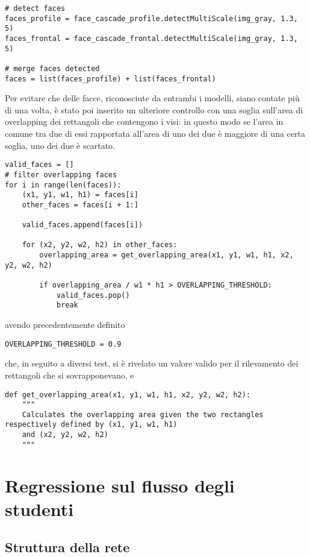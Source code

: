 \begin{verbatim}
# detect faces
faces_profile = face_cascade_profile.detectMultiScale(img_gray, 1.3, 5)
faces_frontal = face_cascade_frontal.detectMultiScale(img_gray, 1.3, 5)

# merge faces detected
faces = list(faces_profile) + list(faces_frontal)
\end{verbatim} 

Per evitare che delle facce, riconosciute da entrambi i modelli, siano contate più di una volta, è stato poi
inserito un ulteriore controllo con una soglia sull'area di overlapping dei rettangoli che contengono i visi:
in questo modo se l'area in comune tra due di essi rapportata all'area di uno dei due è maggiore di una certa 
soglia, uno dei due è scartato.

\begin{verbatim}
valid_faces = []
# filter overlapping faces
for i in range(len(faces)):
    (x1, y1, w1, h1) = faces[i]
    other_faces = faces[i + 1:]

    valid_faces.append(faces[i])

    for (x2, y2, w2, h2) in other_faces:
        overlapping_area = get_overlapping_area(x1, y1, w1, h1, x2, y2, w2, h2)

        if overlapping_area / w1 * h1 > OVERLAPPING_THRESHOLD:
            valid_faces.pop()
            break
\end{verbatim}
\noindent
avendo precedentemente definito

\begin{verbatim}
OVERLAPPING_THRESHOLD = 0.9
\end{verbatim} 

\noindent
che, in seguito a diversi test, si è rivelato un valore valido per il rilevamento 
dei rettangoli che si sovrapponevano, e

\begin{verbatim}
def get_overlapping_area(x1, y1, w1, h1, x2, y2, w2, h2):
    """
    Calculates the overlapping area given the two rectangles respectively defined by (x1, y1, w1, h1)
    and (x2, y2, w2, h2)
    """
\end{verbatim} 

\section{Regressione sul flusso degli studenti}
\label{section:methods_ml}

\subsection{Struttura della rete}
\label{section:methods_ml_structure}

